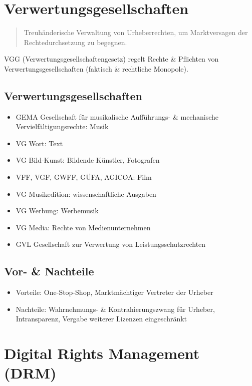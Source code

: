 \documentclass{article}
\begin{document}
\section{Verwertungsgesellschaften}
\begin{quote}Treuhänderische Verwaltung von Urheberrechten, um Marktversagen der Rechtedurchsetzung zu begegnen.\end{quote}

VGG (Verwertungsgesellschaftengesetz) regelt Rechte \& Pflichten von Verwertungsgesellschaften (faktisch \& rechtliche Monopole).

\subsection{Verwertungsgesellschaften}
\begin{itemize}
  \item GEMA Gesellschaft für musikalische Aufführungs- \& mechanische Vervielfältigungsrechte: Musik
  \item VG Wort: Text
  \item VG Bild-Kunst: Bildende Künstler, Fotografen
  \item  VFF, VGF, GWFF, GÜFA, AGICOA: Film
  \item VG Musikedition: wissenschaftliche Ausgaben
  \item VG Werbung: Werbemusik
  \item VG Media: Rechte von Medienunternehmen
  \item GVL Gesellschaft zur Verwertung von Leistungsschutzrechten
\end{itemize}

\subsection{Vor- \& Nachteile}
\begin{itemize}
  \item Vorteile: One-Stop-Shop, Marktmächtiger Vertreter der Urheber
  \item Nachteile: Wahrnehmungs- \& Kontrahierungszwang für Urheber, Intransparenz, Vergabe weiterer Lizenzen eingeschränkt
\end{itemize}



\section{Digital Rights Management (DRM)}
\end{document}
